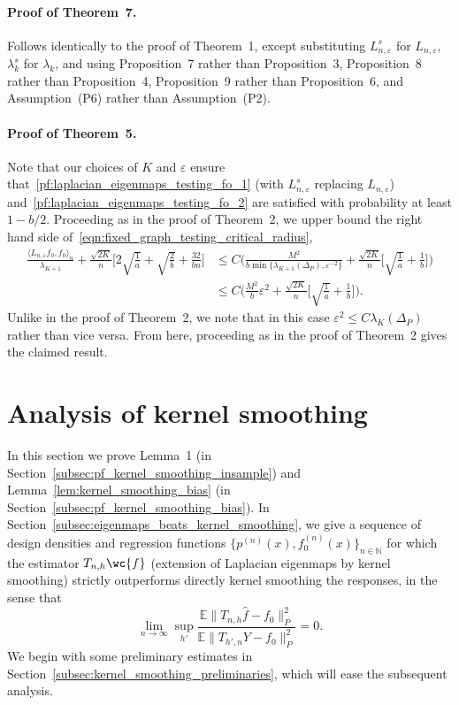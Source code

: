 \documentclass[aos]{imsart}
\theoremstyle{plain}
\theoremstyle{definition}
\theoremstyle{remark}
\newcommand{\Ebb}{\mathbb{E}}
\newcommand{\dotp}[2]{\langle #1, #2 \rangle}
\newcommand{\wh}[1]{\widehat{#1}}
\newcommand{\1}{\mathbf{1}}
\begin{document}
\paragraph{Proof of Theorem~7.}
Follows identically to the proof of Theorem~1, except substituting $L_{n,\varepsilon}^s$ for $L_{n,\varepsilon}$, $\lambda_k^s$ for $\lambda_k$, and using Proposition~7 rather than Proposition~3, Proposition~8 rather than Proposition~4, Proposition~9 rather than Proposition~6, and Assumption~(P6) rather than Assumption~(P2).

\paragraph{Proof of Theorem~5.}
Note that our choices of $K$ and $\varepsilon$ ensure  that~\eqref{pf:laplacian_eigenmaps_testing_fo_1} (with $L_{n,\varepsilon}^s$ replacing $L_{n,\varepsilon}$) and~\eqref{pf:laplacian_eigenmaps_testing_fo_2} are satisfied with probability at least $1 - b/2$. Proceeding as in the proof of Theorem~2, we upper bound the right hand side of~\eqref{eqn:fixed_graph_testing_critical_radius},
\begin{align*}
\frac{\dotp{L_{n,\varepsilon}f_0}{f_0}_n}{\lambda_{K + 1}} + \frac{\sqrt{2K}}{n}\biggl[2\sqrt{\frac{1}{a}} + \sqrt{\frac{2}{b}} + \frac{32}{bn}\biggr] & \leq C\biggl(\frac{M^2}{b \min\{\lambda_{K+1}(\Delta_P), \varepsilon^{-2}\}} + \frac{\sqrt{2K}}{n}\biggl[\sqrt{\frac{1}{a}} + \frac{1}{b}\biggr]\biggr) \\
& \leq C\biggl(\frac{M^2}{b}\varepsilon^2 + \frac{\sqrt{2K}}{n}\biggl[\sqrt{\frac{1}{a}} + \frac{1}{b}\biggr]\biggr).
\end{align*}
Unlike in the proof of Theorem~2, we note that in this case $\varepsilon^2 \leq C\lambda_K(\Delta_P)$ rather than vice versa. From here, proceeding as in the proof of Theorem~2 gives the claimed result.

\section{Analysis of kernel smoothing}
\label{subsec:kernel_smoothing}
In this section we prove Lemma~1 (in Section~\ref{subsec:pf_kernel_smoothing_insample}) and Lemma~\ref{lem:kernel_smoothing_bias} (in Section~\ref{subsec:pf_kernel_smoothing_bias}). In Section~\ref{subsec:eigenmaps_beats_kernel_smoothing}, we give a sequence of design densities and regression functions $\{p^{(n)}(x), f_0^{(n)}(x)\}_{n \in \mathbb{N}}$ for which the estimator $T_{n,h}\wc{f}$ (extension of Laplacian eigenmaps by kernel smoothing) strictly outperforms directly kernel smoothing the responses, in the sense that
\begin{equation*}
\lim_{n \to \infty} \sup_{h'} \frac{\Ebb \|T_{n,h}\wh{f} - f_0\|_P^2}{\Ebb \|T_{h',n}Y - f_0\|_P^2 } = 0.
\end{equation*}
We begin with some preliminary estimates in Section~\ref{subsec:kernel_smoothing_preliminaries}, which will ease the subsequent analysis.
\end{document}
